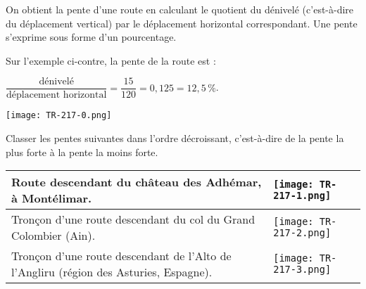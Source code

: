 
On obtient la pente d'une route en calculant le quotient du dénivelé (c'est-à-dire du déplacement vertical) par
le déplacement horizontal correspondant. Une pente s'exprime sous forme d'un pourcentage.

\medskip

\parbox{0.45\linewidth}{Sur l'exemple ci-contre, la pente de la route est :

\medskip

$\dfrac{\text{dénivelé}}{\text{déplacement horizontal}} =  \dfrac{15}{120} = 0,125 = 12,5\,\%$.}
\hfill \parbox{0.52\linewidth}{ \texttt{[image: TR-217-0.png]}
}

\bigskip

Classer les pentes suivantes dans l'ordre décroissant, c'est-à-dire de la pente la plus forte à la pente la moins forte.

\begin{center}
\begin{tabularx}{\linewidth}{|m{6cm}|X|}\hline
Route descendant du château des  Adhémar, à Montélimar.
\vspace{1,75cm}&  \texttt{[image: TR-217-1.png]} \\ \hline
Tronçon d'une route descendant du col 
 du Grand Colombier (Ain).\vspace{1,75cm}&\psset{unit=0.6cm}
 \texttt{[image: TR-217-2.png]} \\ \hline
Tronçon d'une route descendant de l'Alto
de l'Angliru (région des Asturies,
Espagne).\vspace{1,75cm}& \texttt{[image: TR-217-3.png]} \\ \hline
\end{tabularx}
\end{center}




